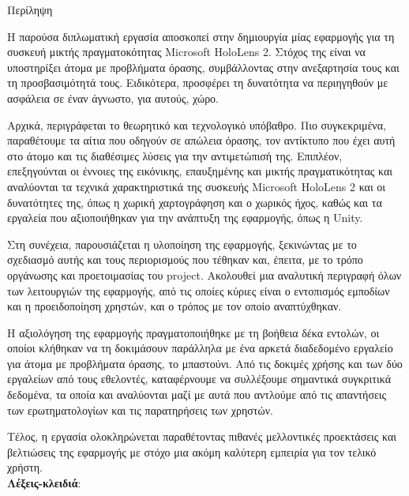 \pagestyle{plain}
\begin{center}
{\LARGE Περίληψη}\\[1cm]
\end{center}

\setlength{\parindent}{0pt}
Η παρούσα διπλωματική εργασία αποσκοπεί στην δημιουργία μίας εφαρμογής για τη συσκευή μικτής πραγματοκότητας Microsoft HoloLens 2. Στόχος της είναι να υποστηρίξει άτομα με προβλήματα όρασης, συμβάλλοντας στην ανεξαρτησία τους και τη προσβασιμότητά τους. Ειδικότερα, προσφέρει τη δυνατότητα να περιηγηθούν με ασφάλεια σε έναν άγνωστο, για αυτούς, χώρο.

Αρχικά, περιγράφεται το θεωρητικό και τεχνολογικό υπόβαθρο. Πιο συγκεκριμένα, παραθέτουμε τα αίτια που οδηγούν σε απώλεια όρασης, τον αντίκτυπο που έχει αυτή στο άτομο και τις διαθέσιμες λύσεις για την αντιμετώπισή της. Επιπλέον, επεξηγούνται οι έννοιες της εικόνικης, επαυξημένης και μικτής πραγματικότητας και αναλύονται τα τεχνικά χαρακτηριστικά της συσκευής Microsoft HoloLens 2 και οι δυνατότητες της, όπως η χωρική χαρτογράφηση και ο χωρικός ήχος, καθώς και τα εργαλεία που αξιοποιήθηκαν για την ανάπτυξη της εφαρμογής, όπως η Unity.

Στη συνέχεια, παρουσιάζεται η υλοποίηση της εφαρμογής, ξεκινώντας με το σχεδιασμό αυτής και τους περιορισμούς που τέθηκαν και, έπειτα, με το τρόπο οργάνωσης και προετοιμασίας του project. Ακολουθεί μια αναλυτική περιγραφή όλων των λειτουργιών της εφαρμογής, από τις οποίες κύριες είναι ο εντοπισμός εμποδίων και η προειδοποίηση χρηστών, και ο τρόπος με τον οποίο αναπτύχθηκαν.

Η αξιολόγηση της εφαρμογής πραγματοποιήθηκε με τη βοήθεια δέκα εντολών, οι οποίοι κλήθηκαν να τη δοκιμάσουν παράλληλα με ένα αρκετά διαδεδομένο εργαλείο για άτομα με προβλήματα όρασης, το μπαστούνι. Από τις δοκιμές χρήσης και των δύο εργαλείων από τους εθελοντές, καταφέρνουμε να συλλέξουμε σημαντικά συγκριτικά δεδομένα, τα οποία και αναλύονται μαζί με αυτά που αντλούμε από τις απαντήσεις των ερωτηματολογίων και τις παρατηρήσεις των χρηστών.

Τέλος, η εργασία ολοκληρώνεται παραθέτοντας πιθανές μελλοντικές προεκτάσεις και βελτιώσεις της εφαρμογής με στόχο μια ακόμη καλύτερη εμπειρία για τον τελικό χρήστη.
\\[\baselineskip]
\textbf{Λέξεις-κλειδιά}: {\keywords}